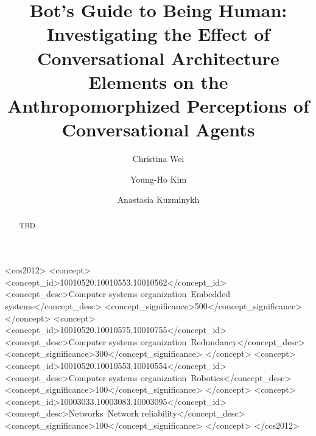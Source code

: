 \documentclass[sigconf,screen,review, anonymous]{acmart}
\begin{document}

\title[Bot's Guide to Being Human]{Bot's Guide to Being Human: Investigating the Effect of Conversational Architecture Elements on the Anthropomorphized Perceptions of Conversational Agents}


\author{Christina Wei}

\author{Young-Ho Kim}

\author{Anastasia Kuzminykh}

\renewcommand{\shortauthors}{Wei, Kim, and Kuzminykh}

\begin{abstract}
  TBD
\end{abstract}

\begin{CCSXML}
<ccs2012>
 <concept>
  <concept_id>10010520.10010553.10010562</concept_id>
  <concept_desc>Computer systems organization~Embedded systems</concept_desc>
  <concept_significance>500</concept_significance>
 </concept>
 <concept>
  <concept_id>10010520.10010575.10010755</concept_id>
  <concept_desc>Computer systems organization~Redundancy</concept_desc>
  <concept_significance>300</concept_significance>
 </concept>
 <concept>
  <concept_id>10010520.10010553.10010554</concept_id>
  <concept_desc>Computer systems organization~Robotics</concept_desc>
  <concept_significance>100</concept_significance>
 </concept>
 <concept>
  <concept_id>10003033.10003083.10003095</concept_id>
  <concept_desc>Networks~Network reliability</concept_desc>
  <concept_significance>100</concept_significance>
 </concept>
</ccs2012>
\end{CCSXML}
\end{document}

